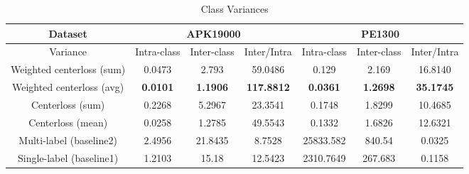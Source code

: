 \begin{table*}[!htb]%
\caption{Class Variances}
\label{tab:class_variances}
\begin{minipage}{\textwidth}
\begin{center}
\begin{tabular}{|c|c|c|c|c|c|c|}
\hline
Dataset             & \multicolumn{3}{c|}{APK19000}                               & \multicolumn{3}{c|}{PE1300}                                             \\ \hline
Variance              & Intra-class  & Inter-class  & Inter/Intra & Intra-class  & Inter-class  & Inter/Intra  \\ \hline
Weighted centerloss (sum)  & 0.0473              &         2.793       &     59.0486             & 0.129               &              2.169 &              16.8140    \\ \hline
Weighted centerloss (avg) & \textbf{0.0101}              &          \textbf{    1.1906} &    \textbf{117.8812 }            & \textbf{0.0361             } &                   \textbf{ 1.2698} &      \textbf{35.1745}                   \\ \hline
Centerloss (sum)         & 0.2268              &                    5.2967 &          23.3541               & 0.1748              &              1.8299       &    10.4685                     \\ \hline
Centerloss (mean)        & 0.0258              &                    1.2785 &           49.5543              & 0.1332              &        1.6826             &     12.6321                    \\ \hline
Multi-label (baseline2)               & 2.4956              &                    21.8435 &       8.7528                    & 25833.582           &        840.54             &        0.0325               \\ \hline
Single-label (baseline1)              & 1.2103              &                    15.18 &            12.5423             & 2310.7649           &      267.683               &           0.1158              \\ \hline
\end{tabular}
\end{center}
\bigskip\centering
\end{minipage}
\end{table*}%


